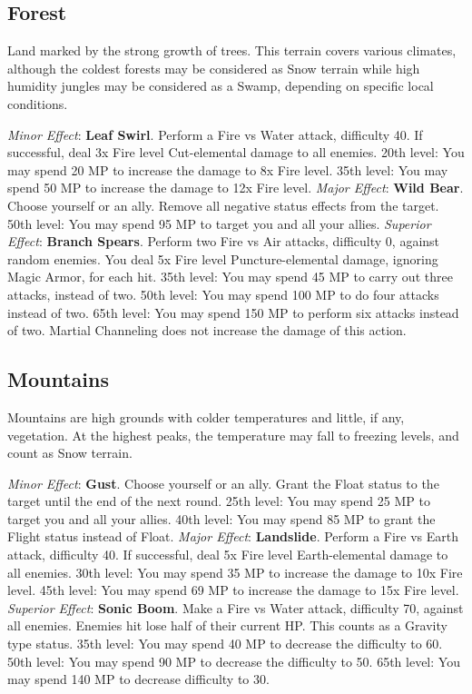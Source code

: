 \begin{multicols}{2}
\subsection{Forest}
\label{subsec:geo-forest}
Land marked by the strong growth of trees. This terrain covers various climates, although the coldest forests may be considered as Snow terrain while high humidity jungles may be considered as a Swamp, depending on specific local conditions.

\textit{Minor Effect}: \textbf{Leaf Swirl}. Perform a Fire vs Water attack, difficulty 40. If successful, deal 3x Fire level Cut-elemental damage to all enemies. 20th level: You may spend 20 MP to increase the damage to 8x Fire level. 35th level: You may spend 50 MP to increase the damage to 12x Fire level.
\textit{Major Effect}: \textbf{Wild Bear}. Choose yourself or an ally. Remove all negative status effects from the target. 50th level: You may spend 95 MP to target you and all your allies.
\textit{Superior Effect}: \textbf{Branch Spears}. Perform two Fire vs Air attacks, difficulty 0, against random enemies. You deal 5x Fire level Puncture-elemental damage, ignoring Magic Armor, for each hit. 35th level: You may spend 45 MP to carry out three attacks, instead of two. 50th level: You may spend 100 MP to do four attacks instead of two. 65th level: You may spend 150 MP to perform six attacks instead of two. Martial Channeling does not increase the damage of this action.

\subsection{Mountains}
\label{subsec:geo-mountain}
Mountains are high grounds with colder temperatures and little, if any, vegetation. At the highest peaks, the temperature may fall to freezing levels, and count as Snow terrain.

\textit{Minor Effect}: \textbf{Gust}. Choose yourself or an ally. Grant the Float status to the target until the end of the next round. 25th level: You may spend 25 MP to target you and all your allies. 40th level: You may spend 85 MP to grant the Flight status instead of Float.
\textit{Major Effect}: \textbf{Landslide}. Perform a Fire vs Earth attack, difficulty 40. If successful, deal 5x Fire level Earth-elemental damage to all enemies. 30th level: You may spend 35 MP to increase the damage to 10x Fire level. 45th level: You may spend 69 MP to increase the damage to 15x Fire level.
\textit{Superior Effect}: \textbf{Sonic Boom}. Make a Fire vs Water attack, difficulty 70, against all enemies. Enemies hit lose half of their current HP. This counts as a Gravity type status. 35th level: You may spend 40 MP to decrease the difficulty to 60. 50th level: You may spend 90 MP to decrease the difficulty to 50. 65th level: You may spend 140 MP to decrease difficulty to 30.


\end{multicols}
